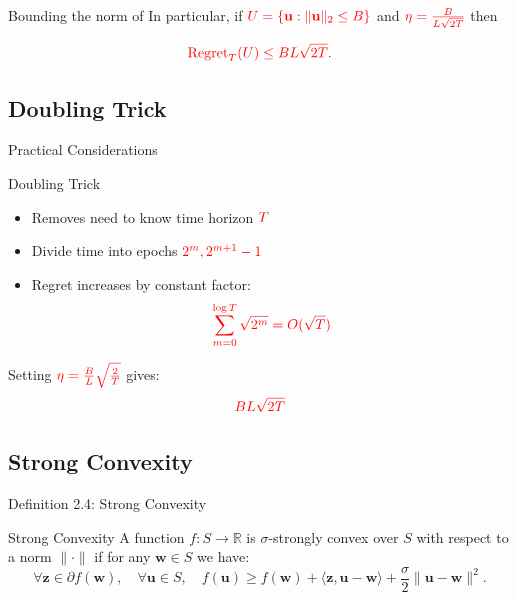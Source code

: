 \documentclass[handout]{beamer}
\begin{document}
\begin{small}
\begin{frame}{Bounding the norm of }
    In particular, if \(\textcolor{red}{U = \{\mathbf{u} : \|\mathbf{u}\|_2 \leq B\}}\) and 
    \(\textcolor{red}{\eta = \frac{B}{L\sqrt{2T}}}\) then

    \begin{equation*}
        \textcolor{red}{\text{Regret}_T(U) \leq B L \sqrt{2T}.}
    \end{equation*}
\end{frame}

\subsection{Doubling Trick}
\begin{frame}{Practical Considerations}
\begin{block}{Doubling Trick}
\begin{itemize}
\item Removes need to know time horizon $\textcolor{red}{T}$
\item Divide time into epochs $\textcolor{red}{2^m,2^{m+1}-1}$
\item Regret increases by constant factor:
\[
\textcolor{red}{\sum_{m=0}^{\log T} \sqrt{2^m} = O(\sqrt{T})}
\]
\end{itemize}
\end{block}

\begin{example}
Setting $\textcolor{red}{\eta = \frac{B}{L}\sqrt{\frac{2}{T}}}$ gives:
\[
\textcolor{red}{BL\sqrt{2T}}
\]
\end{example}
\end{frame}

\subsection{Strong Convexity}
\begin{frame}{Definition 2.4: Strong Convexity}
    \begin{block}{Strong Convexity}
        A function \( f: S \to \mathbb{R} \) is \(\sigma\)-strongly convex over \( S \) with respect to a norm \( \|\cdot\| \) if for any \( \mathbf{w} \in S \) we have:
        \begin{equation*}
            \forall \mathbf{z} \in \partial f(\mathbf{w}), \quad \forall \mathbf{u} \in S, \quad 
            f(\mathbf{u}) \geq f(\mathbf{w}) + \langle \mathbf{z}, \mathbf{u} - \mathbf{w} \rangle + \frac{\sigma}{2} \|\mathbf{u} - \mathbf{w}\|^2.
        \end{equation*}
    \end{block}
\end{frame}


\end{small}
\end{document}
